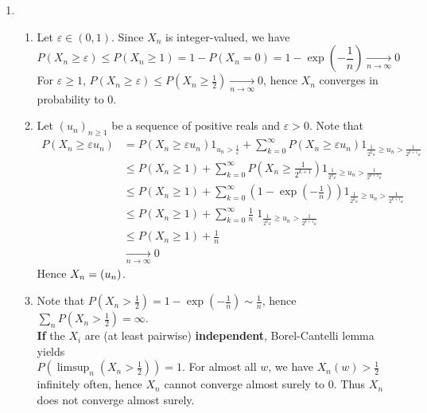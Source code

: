 \documentclass[a4paper,11pt]{article}
\let\o\relax
\DeclareMathOperator*{\o}{\mathit o_{\mathbb P}}
\begin{document}
\begin{enumerate}
  \item 
  \begin{enumerate}
    \item Let $\varepsilon \in (0,1)$. Since $X_n$ is integer-valued, we have $$P(X_n\geq \varepsilon) \leq P(X_n\geq 1) = 1-P(X_n=0) = 1-\exp(-\frac 1n) \xrightarrow[n\to \infty]{} 0$$
    For $\varepsilon \geq 1$, $P(X_n\geq \varepsilon) \leq P(X_n\geq \frac 12) \xrightarrow[n\to \infty]{} 0$, hence $X_n$ converges in probability to $0$.
    \item Let $(u_n)_{n\geq 1}$ be a sequence of positive reals and $\varepsilon >0$. Note that 
    $$\begin{aligned}
      P(X_n\geq \varepsilon u_n) &= P(X_n\geq \varepsilon u_n) 1_{u_n>\frac{1}{\varepsilon}} + \sum_{k=0}^\infty P(X_n\geq \varepsilon u_n) 1_{\frac{1}{2^k \varepsilon} \geq u_n>\frac{1}{2^{k+1} \varepsilon}}\\
      &\leq P(X_n\geq 1) + \sum_{k=0}^\infty P\left(X_n\geq \frac{1}{2^{k+1}}\right) 1_{\frac{1}{2^k \varepsilon} \geq u_n>\frac{1}{2^{k+1} \varepsilon}}\\
      &\leq P(X_n\geq 1) + \sum_{k=0}^\infty \left(1-\exp(-\frac 1n)\right) 1_{\frac{1}{2^k \varepsilon} \geq u_n>\frac{1}{2^{k+1} \varepsilon}}\\
      &\leq P(X_n\geq 1) + \sum_{k=0}^\infty \frac 1n \; 1_{\frac{1}{2^k \varepsilon} \geq u_n>\frac{1}{2^{k+1} \varepsilon}}\\
      &\leq P(X_n\geq 1) + \frac 1n\\
      &\xrightarrow[n\to \infty]{} 0
    \end{aligned}$$
    Hence $X_n=\o(u_n)$.

    \item Note that $P(X_n>\frac 12) = 1-\exp(-\frac 1n)\sim \frac 1n$, hence $\sum_n P(X_n>\frac 12) = \infty$.\\
    \textbf{If} the $X_i$ are (at least pairwise) \textbf{independent}, Borel-Cantelli lemma yields \\
    $P\left(\limsup_n \left(X_n>\frac 12\right)\right)=1$. For almost all $w$, we have $X_n(w)>\frac 12$ infinitely often, hence $X_n$ cannot converge almost surely to $0$. Thus $X_n$ does not converge almost surely.
    \end{enumerate}
  
\end{enumerate}
\end{document}
